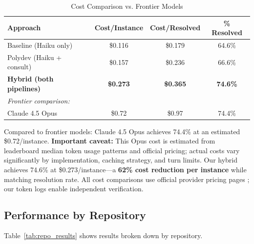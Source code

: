 \documentclass[11pt,a4paper]{article}
\begin{document}
\begin{table}[h]
\centering
\caption{Cost Comparison vs. Frontier Models}
\label{tab:cost}
\begin{tabular}{lccc}
\toprule
\textbf{Approach} & \textbf{Cost/Instance} & \textbf{Cost/Resolved} & \textbf{\% Resolved} \\
\midrule
Baseline (Haiku only) & \$0.116 & \$0.179 & 64.6\% \\
Polydev (Haiku + consult) & \$0.157 & \$0.236 & 66.6\% \\
\textbf{Hybrid (both pipelines)} & \textbf{\$0.273} & \textbf{\$0.365} & \textbf{74.6\%} \\
\midrule
\textit{Frontier comparison:} & & & \\
Claude 4.5 Opus & \$0.72 & \$0.97 & 74.4\% \\
\bottomrule
\end{tabular}
\end{table}

Compared to frontier models: Claude 4.5 Opus achieves 74.4\% at an estimated \$0.72/instance. \textbf{Important caveat:} This Opus cost is estimated from leaderboard median token usage patterns and official pricing; actual costs vary significantly by implementation, caching strategy, and turn limits. Our hybrid achieves 74.6\% at \$0.273/instance---a \textbf{62\% cost reduction per instance} while matching resolution rate. All cost comparisons use official provider pricing pages \citep{anthropic2024pricing,openai2024pricing,google2024geminipricing}; our token logs enable independent verification.

\subsection{Performance by Repository}

Table~\ref{tab:repo_results} shows results broken down by repository.
\end{document}
